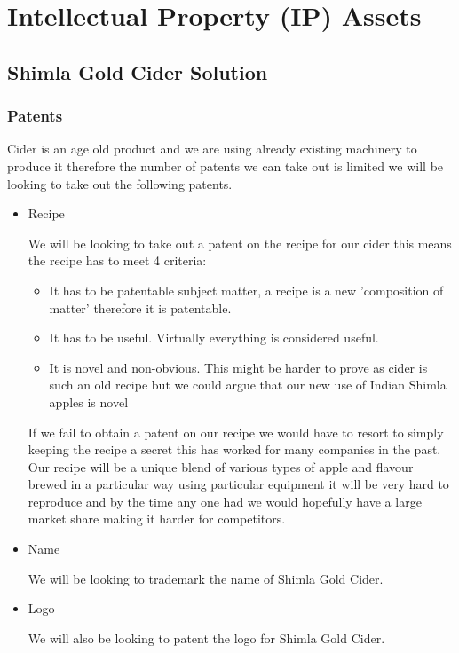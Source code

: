 \documentclass[11pt]{article}
\begin{document}
\newpage


\section{Intellectual Property (IP) Assets}
  \subsection{Shimla Gold Cider Solution}
    \subsubsection{Patents}
Cider is an age old product and we are using already existing machinery to
produce it therefore the number of patents we can take out is limited we will be
looking to take out the following patents.

\begin{itemize}

\item Recipe

We will be looking to take out a patent on the recipe for our cider this means
the recipe has to meet 4 criteria:
 	      \begin{itemize}
		    \item It has to be patentable subject matter, a recipe is a new
'composition of matter' therefore it is patentable.
		    \item It has to be useful. Virtually everything is considered useful.

		    \item It is novel and non-obvious. This might be harder to prove as 
cider is such an old recipe but we could argue that our new use of Indian 
Shimla apples is novel
	      \end{itemize}
If we fail to obtain a patent on our recipe we would have to resort to simply
keeping the recipe a secret this has worked for many companies in the past. Our
recipe will be a unique blend of various types of apple and flavour brewed in a
particular way using particular equipment it will be very hard to reproduce and
by the time any one had we would hopefully have a large market share making it
harder for competitors.

\item Name

We will be looking to trademark the name of Shimla Gold Cider.

\item Logo

We will also be looking to patent the logo for Shimla Gold Cider.
\end{itemize}
\end{document}

